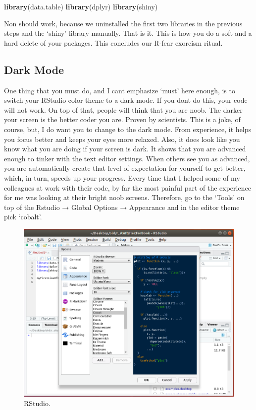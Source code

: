 \documentclass[]{book}
\newenvironment{Shaded}{\begin{snugshade}}{\end{snugshade}}
\newcommand{\KeywordTok}[1]{\textcolor[rgb]{0.13,0.29,0.53}{\textbf{#1}}}
\newcommand{\NormalTok}[1]{#1}
\begin{document}
\begin{Shaded}
\begin{Highlighting}[]
\KeywordTok{library}\NormalTok{(data.table)}
\KeywordTok{library}\NormalTok{(dplyr)}
\KeywordTok{library}\NormalTok{(shiny)}
\end{Highlighting}
\end{Shaded}

Non should work, because we uninstalled the first two libraries in the previous steps and the `shiny' library manually. That is it. This is how you do a soft and a hard delete of your packages. This concludes our R-fear exorcism ritual.

\hypertarget{dark-mode}{%
\subsection{Dark Mode}\label{dark-mode}}

One thing that you must do, and I cant emphasize `must' here enough, is to switch your RStudio color theme to a dark mode. If you dont do this, your code will not work. On top of that, people will think that you are noob. The darker your screen is the better coder you are. Proven by scientists. This is a joke, of course, but, I do want you to change to the dark mode. From experience, it helps you focus better and keeps your eyes more relaxed. Also, it does look like you know what you are doing if your screen is dark. It shows that you are advanced enough to tinker with the text editor settings. When others see you as advanced, you are automatically create that level of expectation for yourself to get better, which, in turn, speeds up your progress. Every time that I helped some of my colleagues at work with their code, by far the most painful part of the experience for me was looking at their bright noob screens. Therefore, go to the `Tools' on top of the Rstudio → Global Options → Appearance and in the editor theme pick `cobalt'.

\begin{figure}
\centering
\includegraphics{rstudio11.png}
\caption{RStudio.}
\end{figure}
\end{document}
